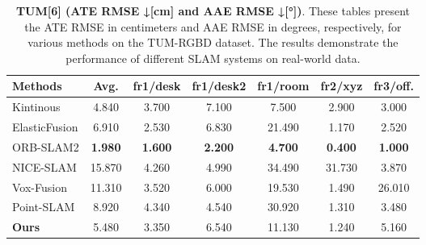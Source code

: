 \documentclass[twocolumn]{article} %
\begin{document}
\begin{table}[htbp]
\renewcommand{\thetable}{\textbf{\arabic{table}}}
\renewcommand{\tablename}{\textbf{Table}}
\centering
\caption{\textbf{TUM[6] (ATE RMSE ↓[cm] and AAE RMSE ↓[°])}. These tables present the ATE RMSE in centimeters and AAE RMSE in degrees, respectively, for various methods on the TUM-RGBD dataset. The results demonstrate the performance of different SLAM systems on real-world data.}
\label{table:_textbf_tum_6_ate_rm}
\begin{adjustbox}{max width=\columnwidth,max height=!,center}
\begin{tabular}{lcccccc}
\toprule
\textbf{Methods} & \textbf{Avg.} & \textbf{fr1/desk} & \textbf{fr1/desk2} & \textbf{fr1/room} & \textbf{fr2/xyz} & \textbf{fr3/off.}\\
\midrule
Kintinous & \cellcolor{yellow!30}4.840 & 3.700 & 7.100 & \cellcolor{yellow!30}7.500 & 2.900 & \cellcolor{lime!50}3.000\\
ElasticFusion & 6.910 & \cellcolor{yellow!30}2.530 & 6.830 & 21.490 & \cellcolor{yellow!30}1.170 & \cellcolor{yellow!30}2.520\\
ORB-SLAM2 & \cellcolor{green!30}\textbf{1.980} & \cellcolor{green!30}\textbf{1.600} & \cellcolor{green!30}\textbf{2.200} & \cellcolor{green!30}\textbf{4.700} & \cellcolor{green!30}\textbf{0.400} & \cellcolor{green!30}\textbf{1.000}\\
NICE-SLAM & 15.870 & 4.260 & \cellcolor{lime!50}4.990 & 34.490 & 31.730 & 3.870\\
Vox-Fusion & 11.310 & 3.520 & 6.000 & 19.530 & 1.490 & 26.010\\
Point-SLAM & 8.920 & 4.340 & \cellcolor{yellow!30}4.540 & 30.920 & 1.310 & 3.480\\
\midrule
\textbf{Ours} & \cellcolor{lime!50}5.480 & \cellcolor{lime!50}3.350 & 6.540 & \cellcolor{lime!50}11.130 & \cellcolor{lime!50}1.240 & 5.160\\
\bottomrule
\end{tabular}
\end{adjustbox}
\end{table}
\end{document}
